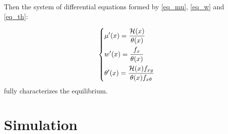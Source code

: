 \documentclass[12pt]{article}
\theoremstyle{definition}
\begin{document}
Then the system of differential equations formed by \eqref{eq_mu}, \eqref{eq_w} and \eqref{eq_th}:

\begin{equation}
\begin{dcases}
        \mu'(x) = \frac{\mathcal{H}(x)}{\theta(x)} \\
        w^{\prime}(x) =\frac{f_{x}}{\theta(x)}   \\
        \theta'(x) = \frac{\mathcal{H}(x)f_{x y}}{\theta(x) f_{x \theta}}
\end{dcases}
\end{equation}
fully characterizes the equilibrium.


\section{Simulation}



\end{document}

